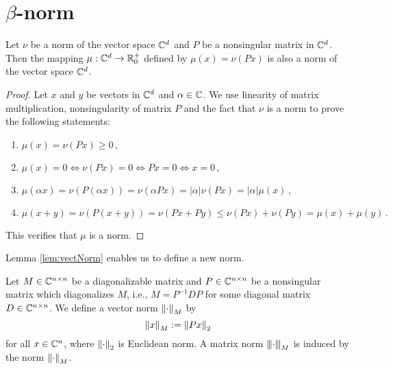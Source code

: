 \section{$\beta$-norm}

\begin{lem}
\label{lem:vectNorm}
Let $\nu$ be a norm of the vector space $\mathbb{C}^d$ and $P$ be a nonsingular matrix in $\mathbb{C}^d$. Then the mapping $\mu:\mathbb{C}^d\rightarrow \mathbb{R}^+_0$ defined by $\mu(x)=\nu(Px)$ is also a norm of the vector space $\mathbb{C}^d$.
\end{lem}
\begin{proof}
Let $x$ and $y$ be vectors in $\mathbb{C}^d$ and $\alpha\in \mathbb{C}$.  We use linearity of matrix multiplication, nonsingularity of matrix $P$ and the fact that $\nu$ is a norm to prove the following statements:
\begin{enumerate}
    \item $\mu(x)=\nu(Px)\geq 0\,,$
    \item $\mu(x)=0 \iff \nu(Px)=0 \iff Px=0 \iff x=0\,,$
    \item $\mu(\alpha x)=\nu(P(\alpha x))=\nu(\alpha Px)=|\alpha|\nu(Px)=|\alpha|\mu(x)\,,$
    \item $\mu(x+y)=\nu(P(x+y))=\nu(Px+Py)\leq \nu(Px)+\nu(Py)=\mu(x)+\mu(y)\,.$
\end{enumerate}
This  verifies that $\mu$ is a norm.
\end{proof}


Lemma \ref{lem:vectNorm} enables us to define a new norm.
\begin{defn}
\label{def:newNorm}
Let $M\in\mathbb{C}^{n\times n}$ be a diagonalizable matrix and $P\in\mathbb{C}^{n\times n}$ be a nonsingular matrix which diagonalizes $M$, i.e., $M=P^{-1}DP$ for some diagonal matrix $D\in\mathbb{C}^{n\times n}$. We define a vector norm $\left\lVert\cdot\right\rVert_{M}$ by  
\begin{equation}
\left\lVert x\right\rVert_{M}:=\left\lVert Px\right\rVert_{2}
\end{equation}
for all $x\in\mathbb{C}^n$, where $\left\lVert\cdot\right\rVert_{2}$ is Euclidean norm. A matrix norm ${\left\vert\kern-0.25ex\left\vert\kern-0.25ex\left\vert \cdot\right\vert\kern-0.25ex\right\vert\kern-0.25ex\right\vert}_{M}$ is induced by the norm $\left\lVert\cdot\right\rVert_{M}$.
\end{defn}

 

